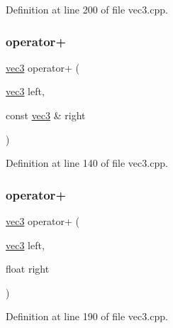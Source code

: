 Definition at line 200 of file vec3.\+cpp.

\mbox{\label{structspork_1_1maths_1_1vec3_ab5ababcc661860b3e72144fa98a0bcc5}} 
\subsubsection{\texorpdfstring{operator+}{operator+}\hspace{0.1cm}{\footnotesize\ttfamily [1/2]}}
{\footnotesize\ttfamily \hyperlink{structspork_1_1maths_1_1vec3}{vec3} operator+ (\begin{DoxyParamCaption}\item[{\hyperlink{structspork_1_1maths_1_1vec3}{vec3}}]{left,  }\item[{const \hyperlink{structspork_1_1maths_1_1vec3}{vec3} \&}]{right }\end{DoxyParamCaption})\hspace{0.3cm}{\ttfamily [friend]}}



Definition at line 140 of file vec3.\+cpp.

\mbox{\label{structspork_1_1maths_1_1vec3_ac068cea1fc332f7cb83b2f9f07e1e544}} 
\subsubsection{\texorpdfstring{operator+}{operator+}\hspace{0.1cm}{\footnotesize\ttfamily [2/2]}}
{\footnotesize\ttfamily \hyperlink{structspork_1_1maths_1_1vec3}{vec3} operator+ (\begin{DoxyParamCaption}\item[{\hyperlink{structspork_1_1maths_1_1vec3}{vec3}}]{left,  }\item[{float}]{right }\end{DoxyParamCaption})\hspace{0.3cm}{\ttfamily [friend]}}



Definition at line 190 of file vec3.\+cpp.

\mbox{\label{structspork_1_1maths_1_1vec3_ac0df6ad93c455d7fb2c2d73dc75b8f65}} 
